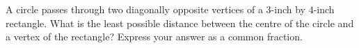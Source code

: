 A circle passes through two diagonally opposite vertices of a $3$-inch by $4$-inch rectangle. What is the least possible distance between the centre of the circle and a vertex of the rectangle? Express your answer as a common fraction.
